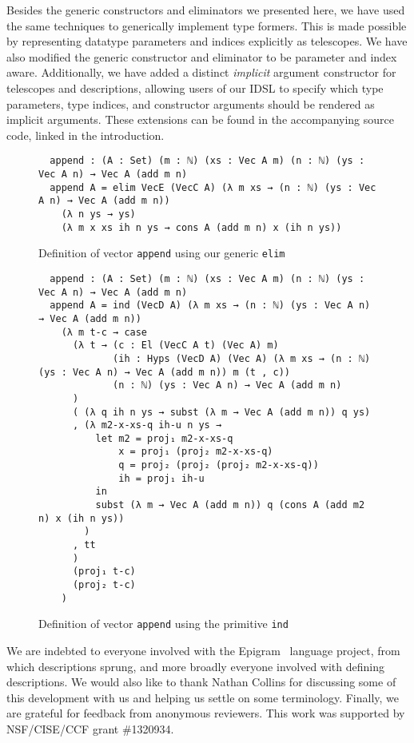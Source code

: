 \documentclass[nonatbib]{sigplanconf}
\begin{document}
Besides the generic constructors and eliminators we presented here, we
have used the same techniques to generically implement type
formers. This is made possible by representing datatype parameters and
indices explicitly as telescopes. We have also modified the generic
constructor and eliminator to be parameter and index aware. Additionally, we have added a
distinct {\it implicit} argument constructor for telescopes and
descriptions, allowing users of our IDSL to specify which type
parameters, type indices, and constructor arguments should be rendered
as implicit arguments. These extensions can be found in the
accompanying source code, linked in the introduction.

\appendix

\begin{figure*}
\caption{Definition of vector {\tt append} using our generic {\tt elim}}
\label{fig:append-elim}
\begin{verbatim}
  append : (A : Set) (m : ℕ) (xs : Vec A m) (n : ℕ) (ys : Vec A n) → Vec A (add m n)
  append A = elim VecE (VecC A) (λ m xs → (n : ℕ) (ys : Vec A n) → Vec A (add m n))
    (λ n ys → ys)
    (λ m x xs ih n ys → cons A (add m n) x (ih n ys))
\end{verbatim}
\end{figure*}

\begin{figure*}
\caption{Definition of vector {\tt append} using the primitive {\tt ind}}
\label{fig:append-ind}
\begin{verbatim}
  append : (A : Set) (m : ℕ) (xs : Vec A m) (n : ℕ) (ys : Vec A n) → Vec A (add m n) 
  append A = ind (VecD A) (λ m xs → (n : ℕ) (ys : Vec A n) → Vec A (add m n))
    (λ m t-c → case
      (λ t → (c : El (VecC A t) (Vec A) m)
             (ih : Hyps (VecD A) (Vec A) (λ m xs → (n : ℕ) (ys : Vec A n) → Vec A (add m n)) m (t , c))
             (n : ℕ) (ys : Vec A n) → Vec A (add m n)
      )
      ( (λ q ih n ys → subst (λ m → Vec A (add m n)) q ys)
      , (λ m2-x-xs-q ih-u n ys →
          let m2 = proj₁ m2-x-xs-q
              x = proj₁ (proj₂ m2-x-xs-q)
              q = proj₂ (proj₂ (proj₂ m2-x-xs-q))
              ih = proj₁ ih-u
          in
          subst (λ m → Vec A (add m n)) q (cons A (add m2 n) x (ih n ys))
        )
      , tt
      )
      (proj₁ t-c)
      (proj₂ t-c)
    )
\end{verbatim}
\end{figure*}

\acks

We are indebted to everyone involved with the
{\sc Epigram}~\citep{mcbride2005epigram} language project, from which
descriptions sprung, and more broadly everyone involved with defining
descriptions.
We would also like to thank Nathan Collins for discussing some of this
development with us and helping us settle on some terminology.
Finally, we are grateful for feedback from anonymous reviewers.
This
work was supported by NSF/CISE/CCF grant \#1320934.



\end{document}
